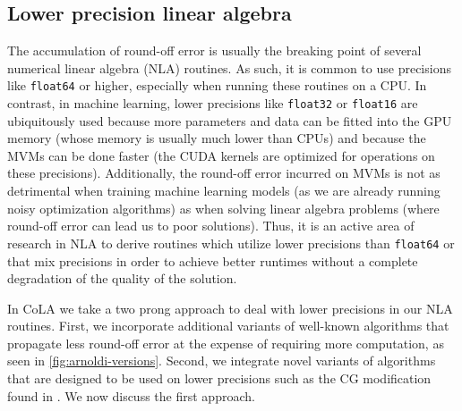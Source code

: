 \documentclass{article}
\begin{document}
\subsection{Lower precision linear algebra} \label{app:lowpres}
The accumulation of round-off error is usually the breaking point of several numerical linear algebra (NLA) routines.
As such, it is common to use precisions like \texttt{float64} or higher,
especially when running these routines on a CPU.
In contrast, in machine learning, lower precisions like \texttt{float32} or \texttt{float16} are ubiquitously used because
more parameters and data can be fitted into the GPU memory (whose memory is usually much lower than CPUs)
and because the MVMs can be done faster (the CUDA kernels are optimized for operations on these precisions).
Additionally, the round-off error incurred on MVMs is not as detrimental when training machine learning models (as we are already running noisy optimization algorithms)
as when solving linear algebra problems (where round-off error can lead us to poor solutions).
Thus, it is an active area of research in NLA to derive routines which utilize lower precisions than \texttt{float64} or that mix precisions
in order to achieve better runtimes without a complete degradation of the quality of the solution.

In CoLA we take a two prong approach to deal with lower precisions in our NLA routines.
First, we incorporate additional variants of well-known algorithms that propagate less round-off error at the expense of requiring more computation,
as seen in \autoref{fig:arnoldi-versions}.
Second, we integrate novel variants of algorithms that are designed to be used on lower precisions such as the CG modification found in \citet{maddox2022lowpres}.
We now discuss the first approach.
\end{document}
